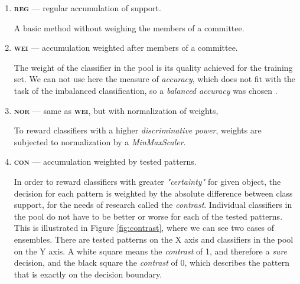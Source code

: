 \documentclass[pmlr]{jmlr}
\begin{document}
\begin{enumerate}
	\item \textbf{\textsc{reg}} --- regular accumulation of support.

A basic method without weighing the members of a committee.

	\item \textbf{\textsc{wei}} --- accumulation weighted after members of a committee.

The weight of the classifier in the pool is its quality achieved for the training set. We can not use here the measure of \emph{accuracy}, which does not fit with the task of the imbalanced classification, so a \emph{balanced accuracy} was chosen \citep{brodersen2010balanced}.

	\item \textbf{\textsc{nor}} --- same as \textbf{\textsc{wei}}, but with normalization of weights,

To reward classifiers with a higher \emph{discriminative power}, weights are subjected to normalization by a \emph{MinMaxScaler}.
	
	\item \textbf{\textsc{con}} --- accumulation weighted by tested patterns.
	
In order to reward classifiers with greater \emph{"certainty"} for given object, the decision for each pattern is weighted by the absolute difference between class support, for the needs of research called the \emph{contrast}. Individual classifiers in the pool do not have to be better or worse for each of the tested patterns. This is illustrated in Figure \ref{fig:contrast}, where we can see two cases of ensembles. There are tested patterns on the X axis and classifiers in the pool on the Y axis. A white square means the \emph{contrast} of 1, and therefore a \emph{sure} decision, and the black square the \emph{contrast} of 0, which describes the pattern that is exactly on the decision boundary.
	

\end{enumerate}
\end{document}
